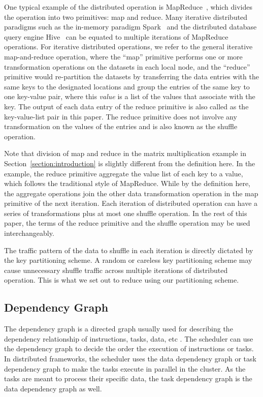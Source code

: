 \documentclass[10pt,journal,compsoc]{IEEEtran}
\begin{document}
One typical example of the distributed operation is
MapReduce~\cite{dean2008mapreduce}, which divides the operation into two
primitives: map and reduce.
Many iterative distributed paradigms such as the in-memory paradigm
Spark~\cite{zaharia2012resilient} and the distributed database query
engine Hive~\cite{thusoo2009hive} can be equated to multiple
iterations of MapReduce operations.
For iterative distributed
operations, we refer to the general iterative map-and-reduce operation, 
where the ``map'' primitive performs one or more transformation operations on the
datasets in each local node, and the ``reduce'' primitive would
re-partition the datasets by transferring the data entries with
the same keys to the designated locations and group the entries of the same key to one key-value pair, where this \textit{value} is a list of the values that associate with the key. 
The output of each data entry of the reduce primitive is also called as the key-value-list pair in this paper.
The reduce primitive does not involve any transformation on the values of the entries and is also known as the shuffle operation. 

Note that division of map and reduce in the matrix multiplication example in Section~\ref{section:introduction} is slightly different from the definition here. 
In the example, the reduce primitive aggregate the value list of each key to a value, which follows the traditional style of MapReduce. 
While by the definition here, the aggregate operations join the other data transformation operation in the map primitive of the next iteration. 
Each iteration of distributed operation can have a series of transformations plus at most one shuffle operation.
In the rest of this paper, the terms of the reduce primitive and the shuffle operation may be used interchangeably. 


The traffic pattern of the data to shuffle in each iteration is directly
dictated by the key partitioning scheme.
A random or careless key partitioning scheme may cause unnecessary
shuffle traffic across multiple iterations of distributed operation.
This is what we set out to reduce using our partitioning scheme.


\subsection{Dependency Graph}
The dependency graph is a directed graph usually used for
describing the dependency relationship of instructions, tasks, data, etc
\cite{sakellariou2004hybrid,zhao2006scheduling,isard2007dryad}.
The scheduler can use the dependency graph to decide the order the execution of instructions or tasks. 
In distributed frameworks, the scheduler uses the data dependency graph
or task dependency graph to make the tasks execute in parallel in the
cluster.
As the tasks are meant to process their specific data, the task dependency
graph is the data dependency graph as well.
\end{document}
